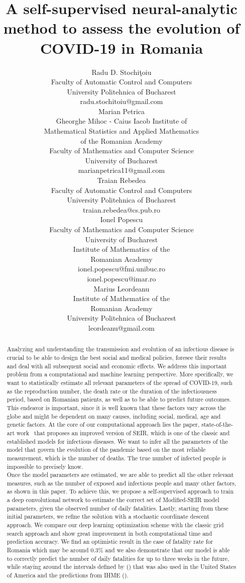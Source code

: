 \documentclass[11pt]{article}
\title{A self-supervised neural-analytic method to assess the evolution of COVID-19 in Romania}
\author{
  Radu D. Stochi\c{t}oiu \\
  {\small Faculty of Automatic Control and Computers}\\
  {\small University Politehnica of Bucharest} \\
  {\small radu.stochitoiu@gmail.com} \\
   \And
   Marian Petrica \\
   {\small Gheorghe Mihoc - Caius Iacob Institute of}\\
   {\small Mathematical Statistics and Applied Mathematics}\\
   {\small of the Romanian Academy}\\
   {\small Faculty of Mathematics and Computer Science}\\
   {\small University of Bucharest}\\
   {\small marianpetrica11@gmail.com} \\
   \And
   Traian Rebedea \\
   {\small Faculty of Automatic Control and Computers}\\
   {\small University Politehnica of Bucharest}\\
   {\small traian.rebedea@cs.pub.ro} \\
   \And
   Ionel Popescu \\
   {\small Faculty of Mathematics and Computer Science}\\ {\small University of Bucharest} \\
   {\small Institute of Mathematics of the} \\
   {\small Romanian Academy} \\
   {\small ionel.popescu@fmi.unibuc.ro\\ ionel.popescu@imar.ro} \\
   \And
   Marius Leordeanu \\
   {\small Institute of Mathematics of the} \\
   {\small Romanian Academy} \\
   {\small University Politehnica of Bucharest} \\
   {\small leordeanu@gmail.com} \\
}
\begin{document}
\maketitle

\begin{abstract}
  Analyzing and understanding the transmission and evolution of an infectious disease is crucial to be able to design the best social and medical policies, foresee their results and deal with all subsequent social and economic effects. We address this important problem from a computational and machine learning perspective. More specifically, we want to statistically estimate all relevant parameters of the spread of COVID-19, such as the reproduction number, the death rate or the duration of the infectiousness period, based on Romanian patients, as well as to be able to predict future outcomes. This endeavor is important, since it is well known that these factors vary across the globe and might be dependent on many causes, including social, medical, age and genetic factors. At the core of our computational approach lies the paper, state-of-the-art work~\cite{chowdhury2020dynamic} that proposes an improved version of SEIR, which is one of the classic and established models for infectious diseases. We want to infer all the parameters of the model that govern the evolution of the pandemic based on the most reliable measurement, which is the number of deaths. The true number of infected people is impossible to precisely know.\\
  Once the model parameters are estimated, we are able to predict all the other relevant measures, such as the number of exposed and infectious people and many other factors, as shown in this paper. To achieve this, we propose a self-supervised approach to train a deep convolutional network to estimate the correct set of Modified-SEIR model parameters, given the observed number of daily fatalities. Lastly, starting from these initial parameters, we refine the solution with a stochastic coordinate descent approach. We compare our deep learning optimization scheme with the classic grid search approach and show great improvement in both computational time and prediction accuracy. We find an optimistic result in the case of fatality rate for Romania which may be around 0.3\% and we also demonstrate that our model is able to correctly predict the number of daily fatalities for up to three weeks in the future, while staying around the intervals defined by (\cite{Youyanggu}) that was also used in the United States of America and the predictions from IHME (\cite{2020.04.21.20074732}).
\end{abstract}
\end{document}
